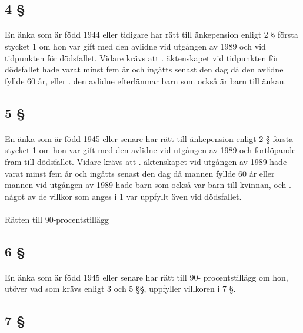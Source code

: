 \documentclass[a4paper,notitlepage,openany,10pt]{book}
\begin{document}
\subsection*{4 §}
\paragraph*{}
En änka som är född 1944 eller tidigare har rätt till änkepension enligt 2 § första stycket 1 om hon var gift med den avlidne vid utgången av 1989 och vid tidpunkten för dödsfallet. Vidare krävs att
. äktenskapet vid tidpunkten för dödsfallet hade varat minst fem år och ingåtts senast den dag då den avlidne fyllde 60 år, eller
. den avlidne efterlämnar barn som också är barn till änkan.
\subsection*{5 §}
\paragraph*{}
En änka som är född 1945 eller senare har rätt till änkepension enligt 2 § första stycket 1 om hon var gift med den avlidne vid utgången av 1989 och fortlöpande fram till dödsfallet. Vidare krävs att
. äktenskapet vid utgången av 1989 hade varat minst fem år och ingåtts senast den dag då mannen fyllde 60 år eller mannen vid utgången av 1989 hade barn som också var barn till kvinnan, och
. något av de villkor som anges i 1 var uppfyllt även vid dödsfallet.
\paragraph*{}
Rätten till 90-procentstillägg
\subsection*{6 §}
\paragraph*{}
En änka som är född 1945 eller senare har rätt till 90- procentstillägg om hon, utöver vad som krävs enligt 3 och 5 §§, uppfyller villkoren i 7 §.
\subsection*{7 §}
\end{document}
